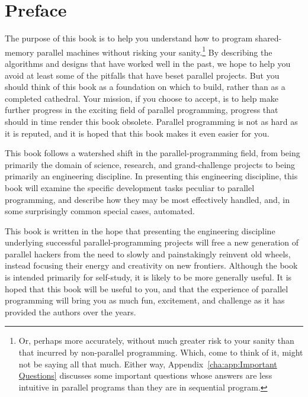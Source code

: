 
\chapter*{Preface}

The purpose of this book is to help you understand how to program
shared-memory parallel machines without risking your sanity.\footnote{
	Or, perhaps more accurately, without much greater risk to your
	sanity than that incurred by non-parallel programming.
	Which, come to think of it, might not be saying all that much.
	Either way, Appendix~\ref{cha:app:Important Questions} discusses
	some important questions whose answers are less intuitive in
	parallel programs than they are in sequential program.}
By describing the algorithms and designs that have worked well in
the past, we hope to help you avoid at least some of the pitfalls
that have beset parallel projects.
But you should think of this book as a foundation on which to build,
rather than as a completed cathedral.
Your mission, if you choose to accept, is to help make further progress
in the exciting field of parallel programming, progress that should
in time render this book obsolete.
Parallel programming is not as hard as it is reputed, and it is hoped
that this book makes it even easier for you.

This book follows a watershed shift in the parallel-programming field,
from being primarily the domain of science, research, and grand-challenge
projects to being primarily an engineering discipline.
In presenting this engineering discipline, this book will examine
the specific development tasks peculiar to parallel programming,
and describe how they may be most effectively handled, and, in some
surprisingly common special cases, automated.

This book is written in the hope that presenting the engineering
discipline underlying successful
parallel-programming projects will free a new generation of parallel hackers
from the need to slowly and painstakingly reinvent old wheels, instead
focusing their energy and creativity on new frontiers.
Although the book is intended primarily for self-study, it is likely
to be more generally useful.
It is hoped that this book will be useful to you, and that the experience
of parallel programming will bring you as much fun, excitement, and
challenge as it has provided the authors over the years.
